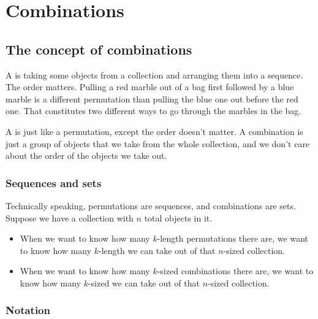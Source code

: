 \documentclass[../../../main.tex]{subfiles}
\begin{document}
\chapter{Combinations}


\section{The concept of combinations}

A  is taking some objects from a collection and arranging them into a sequence. The order matters. Pulling a red marble out of a bag first followed by a blue marble is a different permutation than pulling the blue one out before the red one. That constitutes two different ways to go through the marbles in the bag.

A  is just like a permutation, except the order doesn't matter. A combination is just a group of objects that we take from the whole collection, and we don't care about the order of the objects we take out. 


\subsection{Sequences and sets}

Technically speaking, permutations are sequences, and combinations are sets. Suppose we have a collection with $n$ total objects in it.

\begin{itemize}

  \item When we want to know how many $k$-length permutations there are, we want to know how many $k$-length  we can take out of that $n$-sized collection. 
  
  \item When we want to know how many $k$-sized combinations there are, we want to know how many $k$-sized  we can take out of that $n$-sized collection. 

\end{itemize}


\subsection{Notation}
\end{document}
